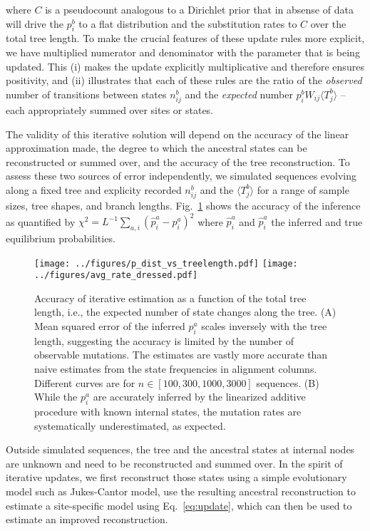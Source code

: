 \documentclass[aps,rmp, onecolumn]{revtex4}
\newcommand{\eqp}{p}
\begin{document}
where $C$ is a pseudocount analogous to a Dirichlet prior that  in absense of data will drive the $\eqp_i^b$ to a flat distribution and the substitution rates to $C$ over the total tree length.
To make the crucial features of these update rules more explicit, we have multiplied numerator and denominator with the parameter that is being updated. This (i) makes the update explicitly multiplicative and therefore ensures positivity, and (ii) illustrates that each of these rules are the ratio of the {\it observed} number of transitions between states $n^b_{ij}$ and the {\it expected} number $\eqp^b_i W_{ij}\langle T_j^b\rangle$ -- each appropriately summed over sites or states.

The validity of this iterative solution will depend on the accuracy of the linear approximation made, the degree to which the ancestral states can be reconstructed or summed over, and the accuracy of the tree reconstruction.
To assess these two sources of error independently, we simulated sequences evolving along a fixed tree and explicity recorded $n_{ij}^b$ and the $\langle T_j^b\rangle$ for a range of sample sizes, tree shapes, and branch lengths.
Fig.~\ref{fig:dressed} shows the accuracy of the inference as quantified by $\chi^2 = L^{-1}\sum_{a,i}(\hat{\eqp}_i^a - \eqp_i^a)^2$ where $\hat{\eqp}_i^a$ and $\hat{\eqp}_i^a$ the inferred and true equilibrium probabilities.


\begin{figure}[tb]
	\centering
	\texttt{[image: ../figures/p\_dist\_vs\_treelength.pdf]}
	\texttt{[image: ../figures/avg\_rate\_dressed.pdf]}
	\caption{Accuracy of iterative estimation as a function of the total tree length, i.e., the expected number of state changes along the tree. (A) Mean squared error of the inferred $\eqp_i^a$ scales inversely with the tree length, suggesting the accuracy is limited by the number of observable mutations.
	The estimates are vastly more accurate than naive estimates from the state frequencies in alignment columns. Different curves are for $n\in [100,300,1000,3000]$ sequences.
	(B) While the $\eqp_i^a$ are accurately inferred by the linearized additive procedure with known internal states, the mutation rates are systematically underestimated, as expected. }
	\label{fig:dressed}
\end{figure}

Outside simulated sequences, the tree and the ancestral states at internal nodes are unknown and need to be reconstructed and summed over.
In the spirit of iterative updates, we first reconstruct those states using a simple evolutionary model such as Jukes-Cantor model, use the resulting ancestral reconstruction to estimate a site-specific model using Eq.~\ref{eq:update}, which can then be used to estimate an improved reconstruction.
\end{document}
